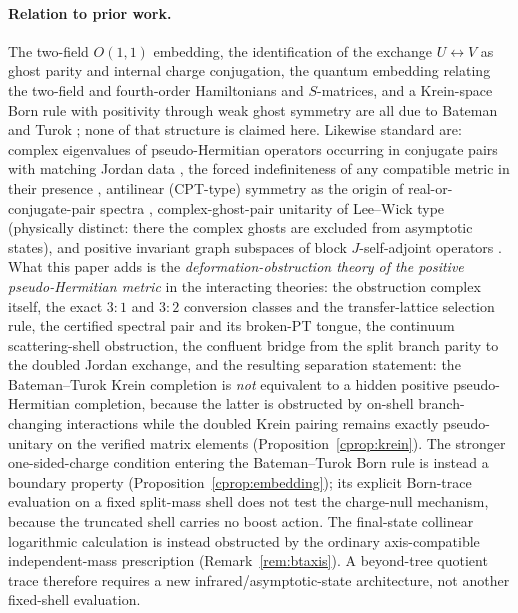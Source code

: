 \documentclass[11pt]{article}
\theoremstyle{definition}
\theoremstyle{remark}
\begin{document}
\paragraph{Relation to prior work.}
The two-field $O(1,1)$ embedding, the identification of the exchange
$U\leftrightarrow V$ as ghost parity and internal charge conjugation,
the quantum embedding relating the two-field and fourth-order
Hamiltonians and $S$-matrices, and a Krein-space Born rule with
positivity through weak ghost symmetry are all due to Bateman and
Turok \cite{BT2026}; none of that structure is claimed here.
Likewise standard are: complex eigenvalues of pseudo-Hermitian
operators occurring in conjugate pairs with matching Jordan data
\cite{Mostafazadeh2002nd}, the forced indefiniteness of any compatible
metric in their presence \cite{FeinbergZnojil2021}, antilinear
(CPT-type) symmetry as the origin of real-or-conjugate-pair spectra
\cite{Mannheim2016}, complex-ghost-pair unitarity of Lee--Wick type
\cite{LiuModestoCalcagni2022} (physically distinct: there the complex
ghosts are excluded from asymptotic states), and
positive invariant graph subspaces of block $J$-self-adjoint operators
\cite{AzizovIokhvidov}.  What this paper adds is the
\emph{deformation-obstruction theory of the positive pseudo-Hermitian
metric} in the interacting theories: the obstruction complex itself,
the exact $3{:}1$ and $3{:}2$ conversion classes and the
transfer-lattice selection rule, the certified spectral pair and its
broken-PT tongue, the continuum scattering-shell obstruction, the
confluent bridge from the split branch parity to the doubled Jordan
exchange, and the resulting separation statement: the Bateman--Turok
Krein completion is \emph{not} equivalent to a hidden positive
pseudo-Hermitian completion, because the latter is obstructed by
on-shell branch-changing interactions while the doubled Krein pairing
remains exactly pseudo-unitary on the verified matrix elements
(Proposition~\ref{cprop:krein}).  The stronger one-sided-charge
condition entering the Bateman--Turok Born rule is instead a boundary
property (Proposition~\ref{cprop:embedding}); its explicit Born-trace
evaluation on a fixed split-mass shell does not test the charge-null mechanism,
because the truncated shell carries no boost action.  The final-state
collinear logarithmic calculation is
instead obstructed by the ordinary axis-compatible independent-mass
prescription (Remark~\ref{rem:btaxis}).  A beyond-tree
quotient trace therefore requires a new infrared/asymptotic-state
architecture, not another fixed-shell evaluation.
\end{document}
